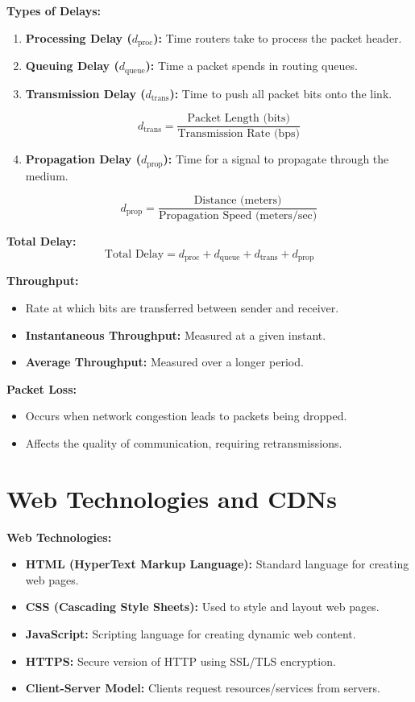 \documentclass[10pt]{article}
\begin{document}
\textbf{Types of Delays:}
\begin{enumerate}
    \item \textbf{Processing Delay (\( d_{\text{proc}} \)):} Time routers take to process the packet header.
    \item \textbf{Queuing Delay (\( d_{\text{queue}} \)):} Time a packet spends in routing queues.
    \item \textbf{Transmission Delay (\( d_{\text{trans}} \)):} Time to push all packet bits onto the link.
    
    \[
    d_{\text{trans}} = \frac{\text{Packet Length (bits)}}{\text{Transmission Rate (bps)}}
    \]
    \item \textbf{Propagation Delay (\( d_{\text{prop}} \)):} Time for a signal to propagate through the medium.

    \[
    d_{\text{prop}} = \frac{\text{Distance (meters)}}{\text{Propagation Speed (meters/sec)}}
    \]
\end{enumerate}

\textbf{Total Delay:}
\[
\text{Total Delay} = d_{\text{proc}} + d_{\text{queue}} + d_{\text{trans}} + d_{\text{prop}}
\]

\textbf{Throughput:}
\begin{itemize}
    \item Rate at which bits are transferred between sender and receiver.
    \item \textbf{Instantaneous Throughput:} Measured at a given instant.
    \item \textbf{Average Throughput:} Measured over a longer period.
\end{itemize}

\textbf{Packet Loss:}
\begin{itemize}
    \item Occurs when network congestion leads to packets being dropped.
    \item Affects the quality of communication, requiring retransmissions.
\end{itemize}

\section*{Web Technologies and CDNs}

\textbf{Web Technologies:}
\begin{itemize}
    \item \textbf{HTML (HyperText Markup Language):} Standard language for creating web pages.
    \item \textbf{CSS (Cascading Style Sheets):} Used to style and layout web pages.
    \item \textbf{JavaScript:} Scripting language for creating dynamic web content.
    \item \textbf{HTTPS:} Secure version of HTTP using SSL/TLS encryption.
    \item \textbf{Client-Server Model:} Clients request resources/services from servers.
\end{itemize}
\end{document}
